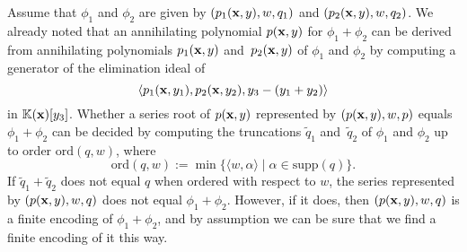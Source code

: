 \documentclass[a4paper,draft]{amsart}
\theoremstyle{definition}
\begin{document}
Assume that $\phi_1$ and $\phi_2$ are given by $(p_1(\bold{x},y), w, q_1)$ and $(p_2(\bold{x},y),w,q_2)$. We already noted that an annihilating polynomial $p(\bold{x},y)$ for $\phi_1 + \phi_2$ can be derived from annihilating polynomials $p_1(\bold{x},y)$ and~$p_2(\bold{x},y)$ of $\phi_1$ and $\phi_2$ by computing a generator of the elimination ideal of 
\begin{equation*}
\langle p_1(\bold{x},y_1),p_2(\bold{x},y_2), y_3-(y_1+y_2)\rangle 
\end{equation*}
in $\mathbb{K}(\bold{x})[y_3]$. Whether a series root of $p(\bold{x},y)$ represented by $(p(\bold{x},y),w,p)$ equals $\phi_1 + \phi_2$ can be decided by computing the truncations $\tilde{q}_1$ and~$\tilde{q}_2$ of $\phi_1$ and $\phi_2$ up to order $\mathrm{ord}(q,w)$, where 
\begin{equation*}
\mathrm{ord}(q,w) := \min \{\langle w,\alpha\rangle \;|\; \alpha \in\mathrm{supp}(q)\}.
\end{equation*}
If $\tilde{q}_1 + \tilde{q}_2$ does not equal $q$ when ordered with respect to $w$, the series represented by $(p(\bold{x},y),w,q)$ does not equal $\phi_1+\phi_2$. However, if it does, then $(p(\bold{x},y),w,q)$ is a finite encoding of $\phi_1+\phi_2$, and by assumption we can be sure that we find a finite encoding of it this way.
\end{document}

